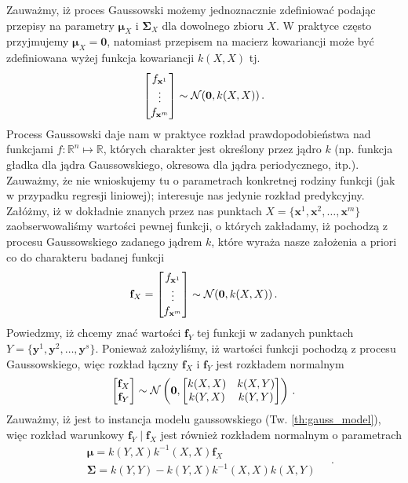 \documentclass{myclass}
\numberwithin{equation}{subsection}
\begin{document}
Zauważmy, iż proces Gaussowski możemy jednoznacznie zdefiniować podając przepisy na parametry
\(\boldsymbol{\mu}_X\) i \(\mathbf{\Sigma}_X\) dla dowolnego zbioru \(X\). W praktyce często
przyjmujemy \(\boldsymbol{\mu}_X = \mathbf{0}\), natomiast przepisem na macierz kowariancji może być
zdefiniowana wyżej funkcja kowariancji \(k(X,X)\) tj.
\begin{equation}
    \mqty[f_{\mathbf{x}^1} \\ \vdots \\ f_{\mathbf{x}^m}] \sim \mathcal{N}(\mathbf{0}, k(X,X))\,.
\end{equation}
Process Gaussowski daje nam w praktyce rozkład prawdopodobieństwa nad funkcjami
\(f:\mathbb{R}^n\mapsto\mathbb{R}\), których charakter jest określony przez jądro \(k\) (np. funkcja
gładka dla jądra Gaussowskiego, okresowa dla jądra periodycznego, itp.). Zauważmy, że nie
wnioskujemy tu o parametrach konkretnej rodziny funkcji (jak w przypadku regresji liniowej);
interesuje nas jedynie rozkład predykcyjny. Załóżmy, iż w dokładnie znanych przez nas punktach \(X =
\{\mathbf{x}^1,\mathbf{x}^2,\ldots,\mathbf{x}^m\}\) zaobserwowaliśmy wartości pewnej funkcji, o
których zakładamy, iż pochodzą z procesu Gaussowskiego zadanego jądrem \(k\), które wyraża nasze
założenia a priori co do charakteru badanej funkcji
\begin{equation}
    \mathbf{f}_X = \mqty[f_{\mathbf{x}^1} \\ \vdots \\ f_{\mathbf{x}^m}] \sim \mathcal{N}(\mathbf{0}, k(X,X))\,.
\end{equation}
Powiedzmy, iż chcemy znać wartości \(\mathbf{f}_Y\) tej funkcji w zadanych punktach \(Y =
\{\mathbf{y}^1,\mathbf{y}^2,\ldots,\mathbf{y}^s\}\). Ponieważ założyliśmy, iż wartości funkcji
pochodzą z procesu Gaussowskiego, więc rozkład łączny \(\mathbf{f}_X\) i \(\mathbf{f}_Y\) jest
rozkładem normalnym
\begin{equation}
    \mqty[\mathbf{f}_X \\ \mathbf{f}_Y] \sim \mathcal{N}\left(\mathbf{0}, \mqty[k(X,X) & k(X,Y) \\ k(Y,X) & k(Y,Y)]\right)\,.
\end{equation}
Zauważmy, iż jest to instancja modelu gaussowskiego (Tw. \ref{th:gauss_model}), więc rozkład
warunkowy \(\mathbf{f}_Y\mid \mathbf{f}_X\) jest również rozkładem normalnym o parametrach
\begin{equation}
    \begin{split}
        &\boldsymbol{\mu} = k(Y,X)k^{-1}(X,X)\mathbf{f}_X\\
        &\mathbf{\Sigma} = k(Y,Y) - k(Y,X)k^{-1}(X,X)k(X,Y)
    \end{split}\quad.
\end{equation}
\end{document}
